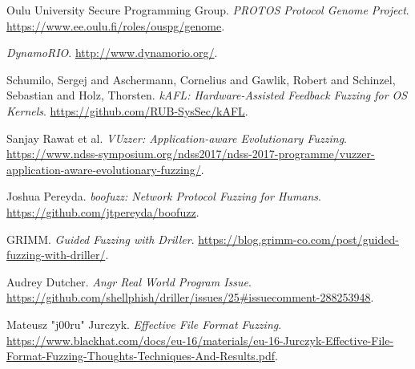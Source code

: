 \begin{thebibliography}{99}
  Oulu University Secure Programming Group.
  \textit{PROTOS Protocol Genome Project}.
  \url{https://www.ee.oulu.fi/roles/ouspg/genome}.

  \textit{DynamoRIO}.
  \url{http://www.dynamorio.org/}.

  Schumilo, Sergej and Aschermann, Cornelius and Gawlik, Robert and Schinzel, Sebastian and Holz, Thorsten.
  \textit{kAFL: Hardware-Assisted Feedback Fuzzing for OS Kernels}.
  \url{https://github.com/RUB-SysSec/kAFL}.

  Sanjay Rawat et al.
  \textit{VUzzer: Application-aware Evolutionary Fuzzing}.
  \url{https://www.ndss-symposium.org/ndss2017/ndss-2017-programme/vuzzer-application-aware-evolutionary-fuzzing/}.

  Joshua Pereyda.
  \textit{boofuzz: Network Protocol Fuzzing for Humans}.
  \url{https://github.com/jtpereyda/boofuzz}.

  GRIMM.
  \textit{Guided Fuzzing with Driller}.
  \url{https://blog.grimm-co.com/post/guided-fuzzing-with-driller/}.

  Audrey Dutcher.
  \textit{Angr Real World Program Issue}.
  \url{https://github.com/shellphish/driller/issues/25#issuecomment-288253948}.

  Mateusz "j00ru" Jurczyk.
  \textit{Effective File Format Fuzzing}.
  \url{https://www.blackhat.com/docs/eu-16/materials/eu-16-Jurczyk-Effective-File-Format-Fuzzing-Thoughts-Techniques-And-Results.pdf}.


\end{thebibliography}
